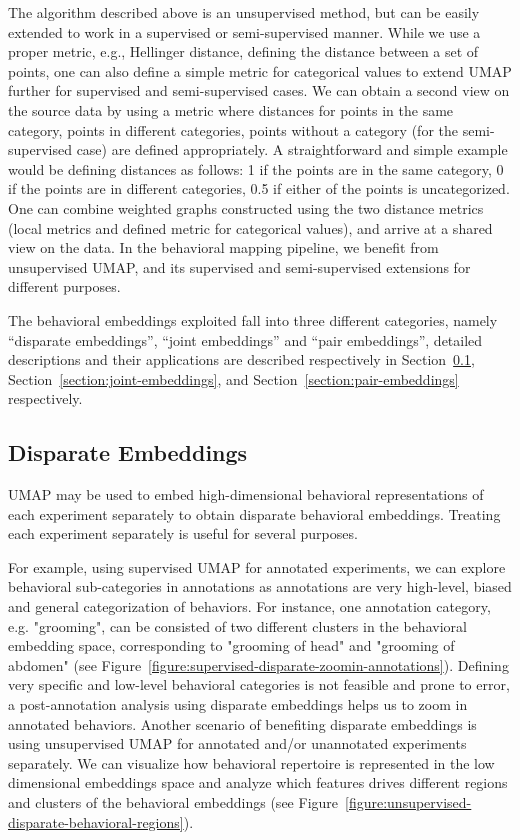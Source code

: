 The algorithm described above is an unsupervised method, but can be easily extended to work in a supervised or semi-supervised manner.
While we use a proper metric, e.g., Hellinger distance, defining the distance between a set of points, one can also define a simple metric for categorical values to extend UMAP further for supervised and semi-supervised cases.
We can obtain a second view on the source data by using a metric where distances for points in the same category, points in different categories, points without a category (for the semi-supervised case) are defined appropriately.
A straightforward and simple example would be defining distances as follows: 1 if the points are in the same category, 0 if the points are in different categories, 0.5 if either of the points is uncategorized.
One can combine weighted graphs constructed using the two distance metrics (local metrics and defined metric for categorical values), and arrive at a shared view on the data.
In the behavioral mapping pipeline, we benefit from unsupervised UMAP, and its supervised and semi-supervised extensions for different purposes.

The behavioral embeddings exploited fall into three different categories, namely ``disparate embeddings'', ``joint embeddings'' and ``pair embeddings'', detailed descriptions and their applications are described respectively in  Section~\ref{section:disparate-embeddings}, Section~\ref{section:joint-embeddings}, and  Section~\ref{section:pair-embeddings} respectively.

\subsection{Disparate Embeddings}\label{section:disparate-embeddings}
UMAP may be used to embed high-dimensional behavioral representations of each experiment separately to obtain disparate behavioral embeddings. Treating each experiment separately is useful for several purposes.

For example, using supervised UMAP for annotated experiments, we can explore behavioral sub-categories in annotations as annotations are very high-level, biased and general categorization of behaviors. For instance, one annotation category, e.g. "grooming", can be consisted of two different clusters in the behavioral embedding space, corresponding to "grooming of head" and "grooming of abdomen" (see Figure~\ref{figure:supervised-disparate-zoomin-annotations}).
Defining very specific and low-level behavioral categories is not feasible and prone to error, a post-annotation analysis using disparate embeddings helps us to zoom in annotated behaviors.
Another scenario of benefiting disparate embeddings is using unsupervised UMAP for annotated and/or unannotated experiments separately.
We can visualize how behavioral repertoire is represented in the low dimensional embeddings space and analyze which features drives different regions and clusters of the behavioral embeddings (see Figure~\ref{figure:unsupervised-disparate-behavioral-regions}).

